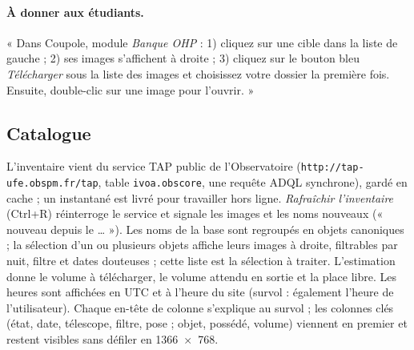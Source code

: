 \paragraph{À donner aux étudiants.} « Dans Coupole, module \emph{Banque OHP} : 1) cliquez sur une cible dans la
liste de gauche ; 2) ses images s'affichent à droite ; 3) cliquez sur le bouton bleu \emph{Télécharger} sous la
liste des images et choisissez votre dossier la première fois. Ensuite, double-clic sur une image pour l'ouvrir. »

\subsection{Catalogue}
L'inventaire vient du service TAP public de l'Observatoire (\texttt{http://tap-ufe.obspm.fr/tap}, table
\texttt{ivoa.obscore}, une requête ADQL synchrone), gardé en cache ; un instantané est livré pour travailler hors
ligne. \emph{Rafraîchir l'inventaire} (Ctrl+R) réinterroge le service et signale les images et les noms nouveaux
(« nouveau depuis le … »). Les noms de la base sont regroupés en objets canoniques ; la sélection d'un ou plusieurs
objets affiche leurs images à droite, filtrables par nuit, filtre et dates douteuses ; cette liste est la sélection
à traiter. L'estimation donne le volume à télécharger, le volume attendu en sortie et la place libre. Les heures
sont affichées en UTC et à l'heure du site (survol : également l'heure de l'utilisateur). Chaque en-tête de colonne
s'explique au survol ; les colonnes clés (état, date, télescope, filtre, pose ; objet, possédé, volume) viennent en
premier et restent visibles sans défiler en 1366~×~768.

